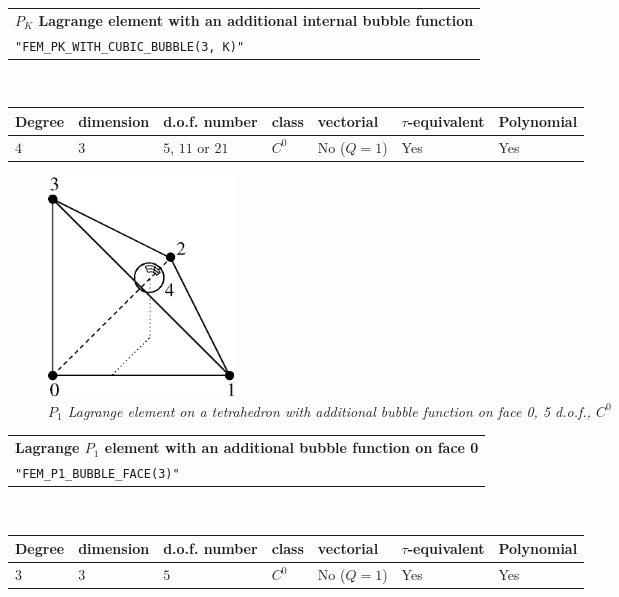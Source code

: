 \documentclass[10pt,a4paper]{article}
\begin{document}
\begin{center}
\begin{tabular}{|m{16.11cm}|} \hline 
{ \bf $P_K$ Lagrange element with an additional internal bubble function}\\
{\tt "FEM\_PK\_WITH\_CUBIC\_BUBBLE(3, K)"} 
\end{tabular} \\ \vspace{-1pt} 
\begin{tabular}{|m{2cm}|m{2cm}|m{2.5cm}|m{1.2cm}|m{2cm}|m{2cm}|m{1.8cm}|} \hline 
Degree & dimension & d.o.f. number & class & vectorial & \mbox{$\tau$-equivalent} & Polynomial\\ \hline
$4$ & $3$ & $5$, $11$ or $21$ & $C^0$ & No \mbox{($Q = 1$)} & Yes & Yes\\ \hline
\end{tabular}
\end{center}

\begin{figure}[H]
  \begin{center}
    \includegraphics[width=5cm,angle=0]{getfemlist_tetrahedron_P1_bubble_face.eps}
  \end{center}
  \caption{ \it $P_1$ Lagrange element on a tetrahedron with additional bubble function on face 0, 5 d.o.f., $C^0$} 
  \label{fig:tetrahedron_p1_bubble_face}
\end{figure}

\begin{center}
\begin{tabular}{|m{16.11cm}|} \hline 
{ \bf Lagrange $P_1$ element with an additional bubble function on face 0}\\
{\tt "FEM\_P1\_BUBBLE\_FACE(3)"} 
\end{tabular} \\ \vspace{-1pt} 
\begin{tabular}{|m{2cm}|m{2cm}|m{2.5cm}|m{1.2cm}|m{2cm}|m{2cm}|m{1.8cm}|} \hline 
Degree & dimension & d.o.f. number & class & vectorial & \mbox{$\tau$-equivalent} & Polynomial\\ \hline
$3$ & $3$ & $5$ & $C^0$ & No \mbox{($Q = 1$)} & Yes & Yes\\ \hline
\end{tabular}
\end{center}
\end{document}
